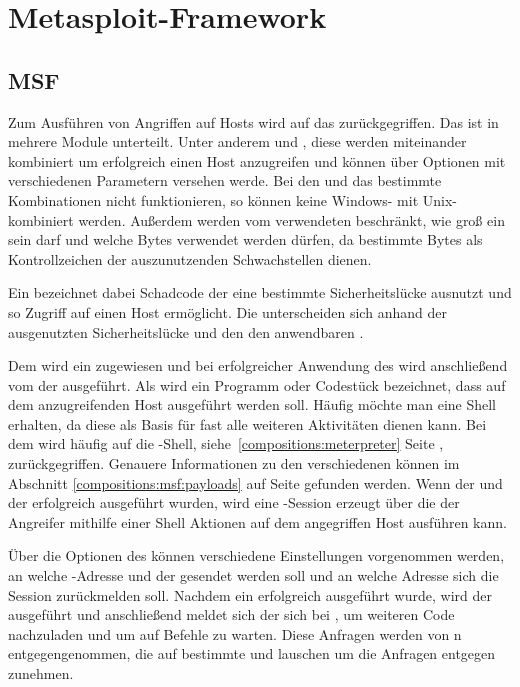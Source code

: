 \section{Metasploit-Framework}
  \label{sec:msf_framework}
  \authors{\LM}{\HM \and \DE \and \DH}
\subsection{MSF}
  \label{sub_sec:msf}

Zum Ausführen von Angriffen auf Hosts wird auf das 
zurückgegriffen. Das  ist in mehrere Module unterteilt. Unter
anderem  und , diese werden miteinander
kombiniert um erfolgreich einen Host anzugreifen und können über Optionen
mit verschiedenen Parametern versehen werde. Bei den  und
 das bestimmte Kombinationen nicht funktionieren, so können
keine Windows- mit Unix- kombiniert werden.
Außerdem werden vom verwendeten  beschränkt, wie groß ein
 sein darf und welche Bytes verwendet werden dürfen, da
bestimmte Bytes als Kontrollzeichen der auszunutzenden Schwachstellen
dienen.

Ein  bezeichnet dabei Schadcode der eine bestimmte
Sicherheitslücke ausnutzt und so Zugriff auf einen Host ermöglicht. Die
 unterscheiden sich anhand der ausgenutzten
Sicherheitslücke und den den anwendbaren .

Dem  wird ein  zugewiesen und bei erfolgreicher
Anwendung des  wird anschließend vom  der
 ausgeführt. Als  wird ein Programm oder
Codestück bezeichnet, dass auf dem anzugreifenden Host ausgeführt werden
soll. Häufig möchte man eine Shell erhalten, da diese als Basis für fast alle
weiteren Aktivitäten dienen kann. Bei dem  wird häufig auf die
-Shell, siehe~\ref{compositions:meterpreter} Seite
\pageref{compositions:meterpreter}, zurückgegriffen. Genauere Informationen
zu den verschiedenen  können im Abschnitt
\ref{compositions:msf:payloads} auf Seite \pageref{compositions:msf:payloads}
gefunden werden. Wenn der  und der  erfolgreich
ausgeführt wurden, wird eine -Session erzeugt über die der Angreifer
mithilfe einer Shell Aktionen auf dem angegriffen Host ausführen kann.

Über die Optionen des  können verschiedene Einstellungen vorgenommen
werden, \uA an welche -Adresse und  der  gesendet
werden soll und an welche Adresse sich die Session zurückmelden soll. Nachdem
ein  erfolgreich ausgeführt wurde, wird der 
ausgeführt und anschließend meldet sich der  sich bei , um
weiteren Code nachzuladen und um auf Befehle zu warten. Diese Anfragen werden von
n entgegengenommen, die auf bestimmte  und
 lauschen um die Anfragen entgegen zunehmen.

